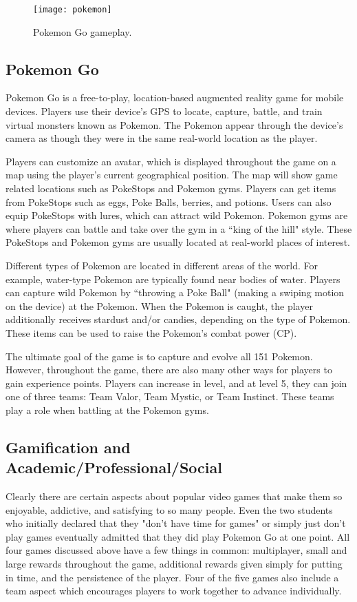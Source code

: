 \begin{figure}[h]
\centering
\texttt{[image: pokemon]}
\caption{Pokemon Go gameplay.}
\end{figure}	
\subsection{Pokemon Go}
Pokemon Go is a free-to-play, location-based augmented reality game for mobile devices. \cite{PokemonGo} Players use their device's GPS to locate, capture, battle, and train virtual monsters known as Pokemon. The Pokemon appear through the device's camera as though they were in the same real-world location as the player. 

Players can customize an avatar, which is displayed throughout the game on a map using the player's current geographical position. The map will show game related locations such as PokeStops and Pokemon gyms. Players can get items from PokeStops such as eggs, Poke Balls, berries, and potions. Users can also equip PokeStops with lures, which can attract wild Pokemon. Pokemon gyms are where players can battle and take over the gym in a ``king of the hill" style. These PokeStops and Pokemon gyms are usually located at real-world places of interest. 

Different types of Pokemon are located in different areas of the world. For example, water-type Pokemon are typically found near bodies of water. Players can capture wild Pokemon by ``throwing a Poke Ball" (making a swiping motion on the device) at the Pokemon. When the Pokemon is caught, the player additionally receives stardust and/or candies, depending on the type of Pokemon. These items can be used to raise the Pokemon's combat power (CP). 

The ultimate goal of the game is to capture and evolve all 151 Pokemon. However, throughout the game, there are also many other ways for players to gain experience points. Players can increase in level, and at level 5, they can join one of three teams: Team Valor, Team Mystic, or Team Instinct. These teams play a role when battling at the Pokemon gyms. 

\subsection{Gamification and Academic/Professional/Social}
Clearly there are certain aspects about popular video games that make them so enjoyable, addictive, and satisfying to so many people. Even the two students who initially declared that they "don't have time for games" or simply just don't play games eventually admitted that they did play Pokemon Go at one point. All four games discussed above have a few things in common: multiplayer, small and large rewards throughout the game, additional rewards given simply for putting in time, and the persistence of the player. Four of the five games also include a team aspect which encourages players to work together to advance individually. 

